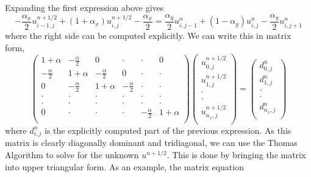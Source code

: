 \documentclass{article}
\newcommand{\uhalf}{u^{n+1/2}}
\begin{document}
Expanding the first expression above gives
$$
  - \frac{\alpha_x}{2}\uhalf_{i-1,j} + (1+\alpha_x)\uhalf_{i,j} - \frac{\alpha_x}{2} = 
  \frac{\alpha_y}{2}u^n_{i,j-1} + (1-\alpha_y)u^n_{i,j} - \frac{\alpha_y}{2}u^n_{i,j+1}
$$
where the right side can be computed explicitly.
We can write this in matrix form,
$$
  \left( \begin{array}{cccccc}
  1+\alpha & -\frac{\alpha}{2} & 0 & \cdot & \cdot& 0 \\
  -\frac{\alpha}{2} & 1+\alpha & -\frac{\alpha}{2} & 0 & \cdot & \cdot \\
  0 & -\frac{\alpha}{2} & 1+\alpha & -\frac{\alpha}{2} & \cdot & \cdot\\
  \cdot & \cdot & \cdot & \cdot & \cdot& \cdot\\
  \cdot & \cdot & \cdot & \cdot & \cdot& \cdot\\
  0 & \cdot& \cdot& \cdot &  -\frac{\alpha}{2} & 1+\alpha \\ \end{array} \right)
  \left( \begin{array}{c}
  \uhalf_{0,j} \\
  \uhalf_{1,j} \\
  \cdot \\
  \cdot \\
  \uhalf_{n_x,j} \\ \end{array} \right)
  =
  \left( \begin{array}{c}
  d^n_{0,j} \\
  d^n_{1,j} \\
  \cdot \\
  \cdot \\
  d^n_{n_x,j} \\ \end{array} \right)
$$
where $d^n_{i,j}$ is the explicitly computed part of the previous expression.
As this matrix is clearly diagonally dominant and tridiagonal, we can use the Thomas Algorithm to solve
for the unknown $\uhalf$.
This is done by bringing the matrix into upper triangular form. As an example, the matrix equation
\end{document}
